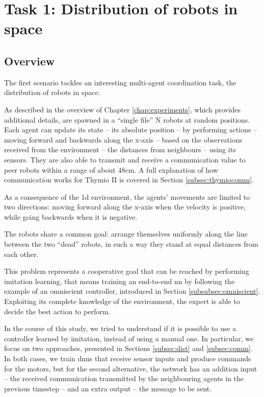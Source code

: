 \section{Task 1: Distribution of robots in space}
\label{sec:task1}

\subsection{Overview}
\label{subsec:desc1}

The first scenario tackles an interesting multi-agent coordination task, the 
distribution of robots in space.

As described in the overview of Chapter \ref{chap:experiments}, which provides 
additional details, are spawned in a ``single file'' N robots at random positions.
Each agent can update its state – its absolute position – by performing actions – 
moving forward and backwards along the x-axis – based on the observations 
received from the environment – the distances from neighbours – using its 
sensors. They are also able to transmit and receive a communication value to 
peer robots within a range of about $48$\gls{cm}. 
A full explanation of how communication works for Thymio II is covered in 
Section \ref{subsec:thymiocomm}.

As a consequence of the \gls{1d} environment, the agents' movements are 
limited to two directions: moving forward along the x-axis when the velocity is 
positive, while going backwards when it is negative. 

The robots share a common goal: arrange themselves uniformly along the 
line between the two ``dead'' robots, in such a way they stand at equal distances 
from each other.

This problem represents a cooperative goal that can be reached by performing 
imitation learning, that means training an end-to-end \gls{nn} by following 
the example of an omniscient controller, introduced in Section 
\ref{subsubsec:omniscient}.
Exploiting its complete knowledge of the environment, the expert is able to 
decide the best action to perform.

In the course of this study, we tried to understand if it is possible to use a 
controller learned by imitation, instead of using a manual one. In particular, we 
focus on two approaches, presented in Sections \ref{subsec:dist} and 
\ref{subsec:comm}.
In both cases, we train \glspl{dnn} that receive sensor inputs and produce 
commands for the motors, but for the second alternative, the network has an 
addition input – the received communication transmitted by the neighbouring 
agents in the previous timestep – and an extra output – the message to be sent.

